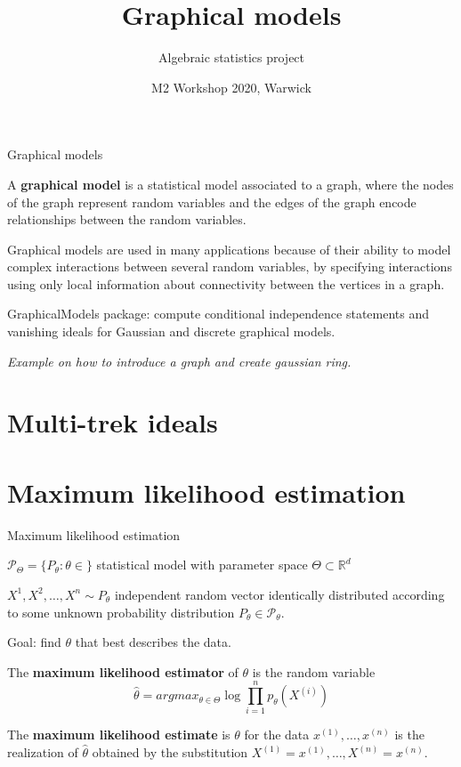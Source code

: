 \documentclass[10pt]{beamer}
\title{Graphical models}
\date{M2 Workshop 2020, Warwick}
\author{Algebraic statistics project}
\begin{document}
\maketitle

\begin{frame}{Graphical models}

A \textbf{graphical model} is a statistical model associated to a graph, where the
nodes of the graph represent random variables and the edges of the graph encode relationships between the random variables. 

\medskip

Graphical models are used
in many applications because of their ability to model complex
interactions between several random variables, by specifying interactions using only local information about connectivity between the vertices in a graph.


\medskip
GraphicalModels package: compute conditional independence statements and vanishing ideals for Gaussian and discrete graphical models.

\emph{Example on how to introduce a graph and create gaussian ring.}
\end{frame}

\section{Multi-trek ideals}

\section{Maximum likelihood estimation}

\begin{frame}{Maximum likelihood estimation}

$\mathcal{P}_{\Theta}=\lbrace P_{\theta}:\theta\in\rbrace$ statistical model with parameter space $\Theta\subset\mathbb{R}^d$

$X^{1},X^{2},\dots,X^{n}\sim P_\theta$ independent random vector identically distributed according to some unknown probability distribution $P_\theta\in\mathcal{P}_\theta$.

Goal: find $\theta$ that best describes the data.


The \textbf{maximum likelihood estimator} of $\theta$ is the random variable
$$\hat{\theta}=argmax_{\theta\in\Theta}\log\prod_{i=1}^n p_\theta(X^{(i)})$$

The \textbf{maximum likelihood estimate} is $\theta$ for the data $x^{(1)},\dots,x^{(n)}$ is the realization of $\hat{\theta}$ obtained by the substitution $X^{(1)}=x^{(1)},\dots,X^{(n)}=x^{(n)}$.

\end{frame}
\end{document}
